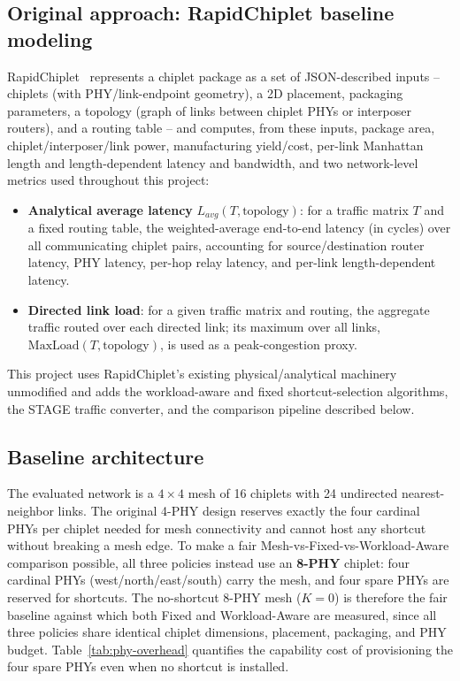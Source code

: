 \documentclass[conference]{IEEEtran}
\begin{document}
\subsection{Original approach: RapidChiplet baseline modeling}
RapidChiplet~\cite{rapidchiplet} represents a chiplet package as a set of JSON-described inputs -- chiplets (with PHY/link-endpoint geometry), a 2D placement, packaging parameters, a topology (graph of links between chiplet PHYs or interposer routers), and a routing table -- and computes, from these inputs, package area, chiplet/interposer/link power, manufacturing yield/cost, per-link Manhattan length and length-dependent latency and bandwidth, and two network-level metrics used throughout this project:
\begin{itemize}
\item \textbf{Analytical average latency} $L_{avg}(T,\text{topology})$: for a traffic matrix $T$ and a fixed routing table, the weighted-average end-to-end latency (in cycles) over all communicating chiplet pairs, accounting for source/destination router latency, PHY latency, per-hop relay latency, and per-link length-dependent latency.
\item \textbf{Directed link load}: for a given traffic matrix and routing, the aggregate traffic routed over each directed link; its maximum over all links, $\mathrm{MaxLoad}(T,\text{topology})$, is used as a peak-congestion proxy.
\end{itemize}
This project uses RapidChiplet's existing physical/analytical machinery unmodified and adds the workload-aware and fixed shortcut-selection algorithms, the STAGE traffic converter, and the comparison pipeline described below.

\subsection{Baseline architecture}
The evaluated network is a $4\times4$ mesh of 16 chiplets with 24 undirected nearest-neighbor links. The original 4-PHY design reserves exactly the four cardinal PHYs per chiplet needed for mesh connectivity and cannot host any shortcut without breaking a mesh edge. To make a fair Mesh-vs-Fixed-vs-Workload-Aware comparison possible, all three policies instead use an \textbf{8-PHY} chiplet: four cardinal PHYs (west/north/east/south) carry the mesh, and four spare PHYs are reserved for shortcuts. The no-shortcut 8-PHY mesh ($K{=}0$) is therefore the fair baseline against which both Fixed and Workload-Aware are measured, since all three policies share identical chiplet dimensions, placement, packaging, and PHY budget. Table~\ref{tab:phy-overhead} quantifies the capability cost of provisioning the four spare PHYs even when no shortcut is installed.
\end{document}
